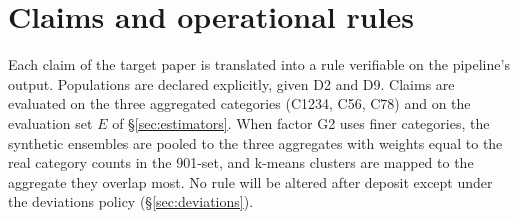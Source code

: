 \documentclass[11pt,a4paper]{article}
\newcommand{\prop}[1]{#1}
\newcommand{\prop}[1]{\textcolor{blue}{#1}}
\begin{document}
\section{Claims and operational rules}\label{sec:claims}
Each claim of the target paper is translated into a rule verifiable on the
pipeline's output. Populations are declared explicitly, given D2 and D9.
\prop{Claims are evaluated on the three aggregated categories (C1234, C56,
C78) and on the evaluation set $E$ of \S\ref{sec:estimators}. When factor G2
uses finer categories, the synthetic ensembles are pooled to the three
aggregates with weights equal to the real category counts in the 901-set,
and k-means clusters are mapped to the aggregate they overlap most.} No rule
will be altered after deposit except under the deviations policy
(\S\ref{sec:deviations}).
\end{document}
